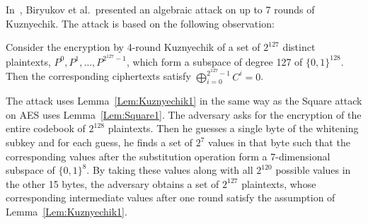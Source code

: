 In~\cite{TOSC:BirKhoPer16}, Biryukov et al.~presented an algebraic attack on up to 7 rounds of Kuznyechik. The attack is based on the following observation: 
\begin{lemma}\label{Lem:Kuznyechik1}
Consider the encryption by 4-round Kuznyechik of a set of $2^{127}$ distinct plaintexts, $P^0,P^1,\ldots,P^{2^{127}-1}$, which form a subspace of degree 127 of $\{0,1\}^{128}$. Then the corresponding ciphertexts satisfy $\bigoplus_{i=0}^{2^{127}-1} C^i=0$.  
\end{lemma}
The attack uses Lemma~\ref{Lem:Kuznyechik1} in the same way as the Square attack on AES uses Lemma~\ref{Lem:Square1}. The adversary asks for the encryption of the entire codebook of $2^{128}$ plaintexts. Then he guesses a single byte of the whitening subkey and for each guess, he finds a set of $2^7$ values in that byte such that the corresponding values after the substitution operation form a 7-dimensional subspace of $\{0,1\}^8$. By taking these values along with all $2^{120}$ possible values in the other 15 bytes, the adversary obtains a set of $2^{127}$ plaintexts, whose corresponding intermediate values after one round satisfy the assumption of Lemma~\ref{Lem:Kuznyechik1}. 

